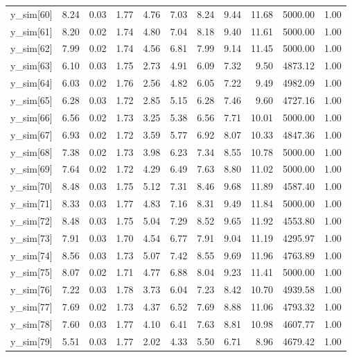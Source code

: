 \begin{table}[ht]
\begin{tabular}{rrrrrrrrrrr}
  y\_sim[60] & 8.24 & 0.03 & 1.77 & 4.76 & 7.03 & 8.24 & 9.44 & 11.68 & 5000.00 & 1.00 \\ 
  y\_sim[61] & 8.20 & 0.02 & 1.74 & 4.80 & 7.04 & 8.18 & 9.40 & 11.61 & 5000.00 & 1.00 \\ 
  y\_sim[62] & 7.99 & 0.02 & 1.74 & 4.56 & 6.81 & 7.99 & 9.14 & 11.45 & 5000.00 & 1.00 \\ 
  y\_sim[63] & 6.10 & 0.03 & 1.75 & 2.73 & 4.91 & 6.09 & 7.32 & 9.50 & 4873.12 & 1.00 \\ 
  y\_sim[64] & 6.03 & 0.02 & 1.76 & 2.56 & 4.82 & 6.05 & 7.22 & 9.49 & 4982.09 & 1.00 \\ 
  y\_sim[65] & 6.28 & 0.03 & 1.72 & 2.85 & 5.15 & 6.28 & 7.46 & 9.60 & 4727.16 & 1.00 \\ 
  y\_sim[66] & 6.56 & 0.02 & 1.73 & 3.25 & 5.38 & 6.56 & 7.71 & 10.01 & 5000.00 & 1.00 \\ 
  y\_sim[67] & 6.93 & 0.02 & 1.72 & 3.59 & 5.77 & 6.92 & 8.07 & 10.33 & 4847.36 & 1.00 \\ 
  y\_sim[68] & 7.38 & 0.02 & 1.73 & 3.98 & 6.23 & 7.34 & 8.55 & 10.78 & 5000.00 & 1.00 \\ 
  y\_sim[69] & 7.64 & 0.02 & 1.72 & 4.29 & 6.49 & 7.63 & 8.80 & 11.02 & 5000.00 & 1.00 \\ 
  y\_sim[70] & 8.48 & 0.03 & 1.75 & 5.12 & 7.31 & 8.46 & 9.68 & 11.89 & 4587.40 & 1.00 \\ 
  y\_sim[71] & 8.33 & 0.03 & 1.77 & 4.83 & 7.16 & 8.31 & 9.49 & 11.84 & 5000.00 & 1.00 \\ 
  y\_sim[72] & 8.48 & 0.03 & 1.75 & 5.04 & 7.29 & 8.52 & 9.65 & 11.92 & 4553.80 & 1.00 \\ 
  y\_sim[73] & 7.91 & 0.03 & 1.70 & 4.54 & 6.77 & 7.91 & 9.04 & 11.19 & 4295.97 & 1.00 \\ 
  y\_sim[74] & 8.56 & 0.03 & 1.73 & 5.07 & 7.42 & 8.55 & 9.69 & 11.96 & 4763.89 & 1.00 \\ 
  y\_sim[75] & 8.07 & 0.02 & 1.71 & 4.77 & 6.88 & 8.04 & 9.23 & 11.41 & 5000.00 & 1.00 \\ 
  y\_sim[76] & 7.22 & 0.03 & 1.78 & 3.73 & 6.04 & 7.23 & 8.42 & 10.70 & 4939.58 & 1.00 \\ 
  y\_sim[77] & 7.69 & 0.02 & 1.73 & 4.37 & 6.52 & 7.69 & 8.88 & 11.06 & 4793.32 & 1.00 \\ 
  y\_sim[78] & 7.60 & 0.03 & 1.77 & 4.10 & 6.41 & 7.63 & 8.81 & 10.98 & 4607.77 & 1.00 \\ 
  y\_sim[79] & 5.51 & 0.03 & 1.77 & 2.02 & 4.33 & 5.50 & 6.71 & 8.96 & 4679.42 & 1.00 \\ 

\end{tabular}
\end{table}
